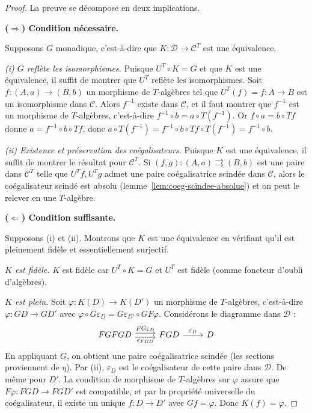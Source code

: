 \documentclass[a4paper,12pt]{book}
\begin{document}
\begin{proof}
La preuve se décompose en deux implications.

\medskip
\textbf{($\Rightarrow$) Condition nécessaire.}

Supposons $G$ monadique, c'est-à-dire que $K \colon \mathcal{D} \to
\mathcal{C}^T$ est une équivalence.

\emph{(i) $G$ reflète les isomorphismes.}
Puisque $U^T \circ K = G$ et que $K$ est une équivalence,
il suffit de montrer que $U^T$ reflète les isomorphismes.
Soit $f \colon (A, a) \to (B, b)$ un morphisme de $T$-algèbres
tel que $U^T(f) = f \colon A \to B$ est un isomorphisme dans $\mathcal{C}$.
Alors $f^{-1}$ existe dans $\mathcal{C}$, et il faut montrer que
$f^{-1}$ est un morphisme de $T$-algèbres, c'est-à-dire
$f^{-1} \circ b = a \circ T(f^{-1})$.
Or $f \circ a = b \circ Tf$ donne
$a = f^{-1} \circ b \circ Tf$, donc
$a \circ T(f^{-1}) = f^{-1} \circ b \circ Tf \circ T(f^{-1})
= f^{-1} \circ b$.

\emph{(ii) Existence et préservation des coégalisateurs.}
Puisque $K$ est une équivalence, il suffit de montrer le résultat
pour $\mathcal{C}^T$. Si $(f, g) \colon (A,a) \rightrightarrows (B,b)$
est une paire dans $\mathcal{C}^T$ telle que $U^T f, U^T g$ admet
une paire coégalisatrice scindée dans $\mathcal{C}$, alors le coégalisateur
scindé est absolu (lemme~\ref{lem:coeg-scindee-absolue}) et on peut le relever
en une $T$-algèbre.

\medskip
\textbf{($\Leftarrow$) Condition suffisante.}

Supposons (i) et (ii). Montrons que $K$ est une équivalence
en vérifiant qu'il est pleinement fidèle et essentiellement surjectif.

\emph{$K$ est fidèle.}
$K$ est fidèle car $U^T \circ K = G$ et $U^T$ est fidèle
(comme foncteur d'oubli d'algèbres).

\emph{$K$ est plein.}
Soit $\varphi \colon K(D) \to K(D')$ un morphisme de $T$-algèbres,
c'est-à-dire $\varphi \colon GD \to GD'$ avec
$\varphi \circ G\varepsilon_D = G\varepsilon_{D'} \circ GF\varphi$.
Considérons le diagramme dans $\mathcal{D}$ :
\[
\begin{tikzcd}
FGFGD \arrow[r, shift left, "FG\varepsilon_D"] \arrow[r, shift right, "\varepsilon_{FGD}"'] &
FGD \arrow[r, "\varepsilon_D"] & D
\end{tikzcd}
\]
En appliquant $G$, on obtient une paire coégalisatrice scindée
(les sections proviennent de $\eta$). Par (ii), $\varepsilon_D$ est
le coégalisateur de cette paire dans $\mathcal{D}$.
De même pour $D'$. La condition de morphisme de $T$-algèbres sur
$\varphi$ assure que $F\varphi \colon FGD \to FGD'$ est compatible,
et par la propriété universelle du coégalisateur, il existe un unique
$f \colon D \to D'$ avec $Gf = \varphi$. Donc $K(f) = \varphi$.


\end{proof}
\end{document}
